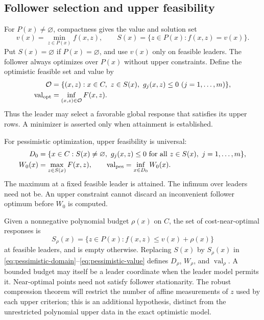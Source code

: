 \subsection{Follower selection and upper feasibility}\label{subsec:semantics}

For $P(x)\ne\varnothing$, compactness gives the value and solution set
\begin{equation}\label{eq:follower-value}
 v(x)=\min_{z\in P(x)} f(x,z),\qquad
 S(x)=\{z\in P(x):f(x,z)=v(x)\}.
\end{equation}
Put $S(x)=\varnothing$ if $P(x)=\varnothing$, and use $v(x)$ only
on feasible leaders. The follower always optimizes over $P(x)$ without
upper constraints. Define the optimistic feasible set and value by
\begin{align}
 \mathcal O&=\{(x,z):x\in C,\ z\in S(x),\
                             g_j(x,z)\le0\ (j=1,\ldots,m)\},
 \label{eq:optimistic-set}\\
 \operatorname{val}_{\rm opt}&=\inf_{(x,z)\in\mathcal O} F(x,z).
 \label{eq:optimistic-value}
\end{align}
Thus the leader may select a favorable global response that satisfies its
upper rows. A minimizer is asserted only when attainment is established.

For pessimistic optimization, upper feasibility is universal:
\begin{align}
 D_0&=\{x\in C:S(x)\ne\varnothing,\
             g_j(x,z)\le0\text{ for all }z\in S(x),\ j=1,\ldots,m\},
 \label{eq:pessimistic-domain}\\
 W_0(x)&=\max_{z\in S(x)}F(x,z),\qquad
 \operatorname{val}_{\rm pes}=\inf_{x\in D_0}W_0(x).
 \label{eq:pessimistic-value}
\end{align}
The maximum at a fixed feasible leader is attained. The infimum over
leaders need not be. An upper constraint cannot discard an inconvenient
follower optimum before $W_0$ is computed.

Given a nonnegative polynomial budget $\rho(x)$ on $C$, the set of
cost-near-optimal responses is
\begin{equation}\label{eq:nearoptimal-set}
 S_\rho(x)=\{z\in P(x):f(x,z)\le v(x)+\rho(x)\}
\end{equation}
at feasible leaders, and is empty otherwise. Replacing $S(x)$ by
$S_\rho(x)$ in \eqref{eq:pessimistic-domain}--\eqref{eq:pessimistic-value}
defines $D_\rho$, $W_\rho$, and $\operatorname{val}_\rho$.
A bounded budget may itself be a leader coordinate when the leader model
permits it. Near-optimal points need not satisfy follower stationarity.
The robust compression theorem will restrict the number of affine
measurements of $z$ used by each upper criterion; this is an additional
hypothesis, distinct from the unrestricted polynomial upper data in the
exact optimistic model.

